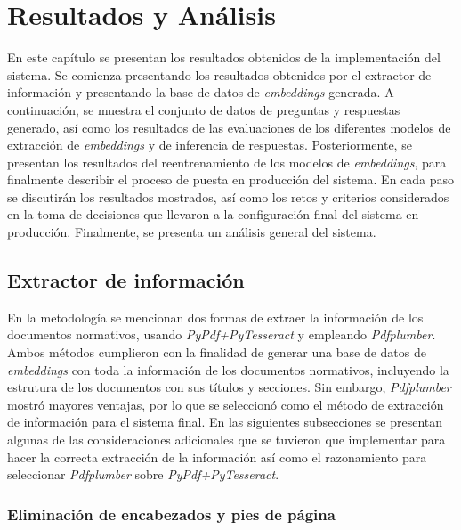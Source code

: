 \chapter{Resultados y Análisis}

En este capítulo se presentan los resultados obtenidos de la implementación
del sistema. Se comienza presentando los resultados obtenidos por el
extractor de información y presentando la base de datos de \textit{embeddings}
generada. A continuación, se muestra el conjunto de datos de preguntas
y respuestas generado, así como los resultados de las
evaluaciones de los diferentes modelos de extracción de \textit{embeddings}
y de inferencia de respuestas. Posteriormente, se presentan
los resultados del reentrenamiento de los modelos de \textit{embeddings},
para finalmente describir el proceso de puesta en producción del sistema.
En cada paso se discutirán los resultados mostrados, así como los retos y
criterios considerados en la toma de decisiones que llevaron a la
configuración final del sistema en producción. Finalmente, se presenta un
análisis general del sistema.

\section{Extractor de información}

En la metodología se mencionan dos formas de extraer la información de los
documentos normativos, usando \textit{PyPdf+PyTesseract} y empleando
\textit{Pdfplumber}. Ambos métodos cumplieron con la finalidad de generar una
base de datos de \textit{embeddings} con toda la información de los
documentos normativos, incluyendo la estrutura de los documentos con
sus títulos y secciones. Sin embargo, \textit{Pdfplumber} mostró mayores
ventajas, por lo que se seleccionó como el método de extracción de información
para el sistema final.
En las siguientes subsecciones se presentan algunas de las consideraciones
adicionales que se tuvieron que implementar para hacer la correcta
extracción de la información así como el razonamiento para seleccionar
\textit{Pdfplumber} sobre \textit{PyPdf+PyTesseract}.

\subsection{Eliminación de encabezados y pies de página}

